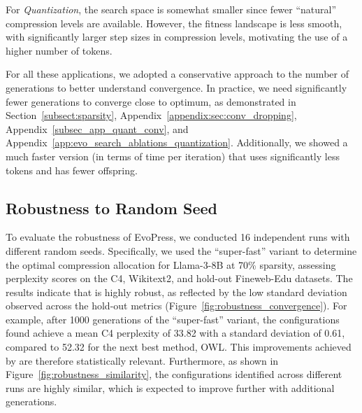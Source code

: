 For \emph{Quantization}, the search space is somewhat smaller since fewer ``natural'' compression levels are available. However, the fitness landscape is less smooth, with significantly larger step sizes in compression levels, motivating the use of a higher number of tokens.

For all these applications, we adopted a conservative approach to the number of generations to better understand convergence. In practice, we need significantly fewer generations to converge close to optimum, as demonstrated in Section~\ref{subsect:sparsity}, Appendix~\ref{appendix:sec:conv_dropping}, Appendix~\ref{subsec_app_quant_conv}, and Appendix~\ref{app:evo_search_ablations_quantization}. Additionally, we showed a much faster version (in terms of time per iteration) that uses significantly less tokens and has fewer offspring. 



\subsection{Robustness to Random Seed}
To evaluate the robustness of EvoPress, we conducted 16 independent runs with different random seeds. Specifically, we used the ``super-fast'' variant to determine the optimal compression allocation for Llama-3-8B at 70\% sparsity, assessing perplexity scores on the C4, Wikitext2, and hold-out Fineweb-Edu datasets. The results indicate that \methodname{} is highly robust, as reflected by the low standard deviation observed across the hold-out metrics (Figure~\ref{fig:robustness_convergence}). For example, after 1000 generations of the ``super-fast'' variant, the configurations found achieve a mean C4 perplexity of 33.82 with a standard deviation of 0.61, compared to 52.32 for the next best method, OWL. This improvements achieved by \methodname{} are therefore statistically relevant. Furthermore, as shown in Figure~\ref{fig:robustness_similarity}, the configurations identified across different runs are highly similar, which is expected to improve further with additional generations.


